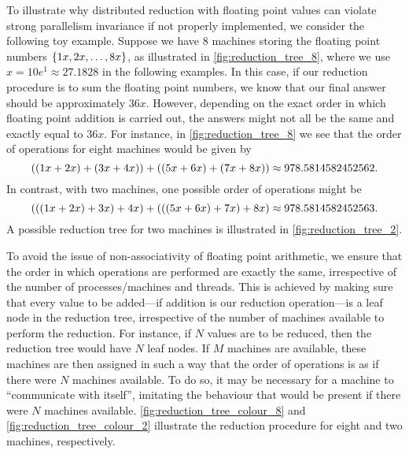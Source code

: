 \medskip 
To illustrate why distributed reduction with floating point values can violate 
strong parallelism invariance if not properly implemented, we consider the 
following toy example. 
Suppose we have 8 machines storing the floating point numbers $\cbra{1x, 2x, \ldots, 8x}$, 
as illustrated in \cref{fig:reduction_tree_8}, where we use $x = 10 e^1 \approx 27.1828$
in the following examples.
In this case, if our reduction procedure is to sum the floating point numbers, 
we know that our final answer should be approximately $36x$. 
However, depending on the exact order in which floating point addition is carried out, 
the answers might not all be the same and exactly equal to $36x$.
For instance, in \cref{fig:reduction_tree_8} we see that the order of operations 
for eight machines would be given by 
\[
  ((1x + 2x) + (3x + 4x)) + ((5x + 6x) + (7x + 8x)) \\
  \approx 978.5814582452562.
\]
In contrast, with two machines, one possible order of operations might be 
\[
  (((1x + 2x) + 3x) + 4x) + (((5x + 6x) + 7x) + 8x) \\
  \approx 978.5814582452563.
\]
A possible reduction tree for two machines is illustrated in \cref{fig:reduction_tree_2}.

\medskip 
To avoid the issue of non-associativity of 
floating point arithmetic, we ensure that the order in which operations are performed 
are exactly the same, irrespective of the number of processes/machines and threads. 
This is achieved by making sure that every value to be added---if addition is our 
reduction operation---is a leaf node in the reduction tree, irrespective of the 
number of machines available to perform the reduction. 
For instance, if $N$ values are to be reduced, then the reduction tree would have 
$N$ leaf nodes. If $M$ machines are available, these machines are then assigned 
in such a way that the order of operations is as if there were $N$ machines available. 
To do so, it may be necessary for a machine to ``communicate with itself'', 
imitating the behaviour that would be present if there were $N$ machines available.
\cref{fig:reduction_tree_colour_8} and \cref{fig:reduction_tree_colour_2} 
illustrate the reduction procedure for eight and two machines, respectively.

